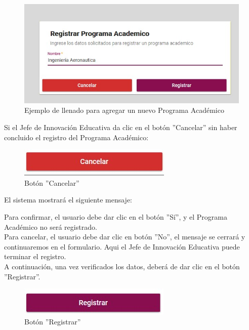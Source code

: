         \begin{figure}[!hbtp]
            \centering
            \hypertarget{ejreg}{\includegraphics[width=0.7\linewidth]{images/SP3/Llenado}}
            \caption{Ejemplo de llenado para agregar un nuevo Programa Académico}
            \label{ejreg}
        \end{figure}

        Si el Jefe de Innovación Educativa da clic en el botón ''Cancelar'' sin haber concluido el registro del Programa Académico:

        \begin{figure}[!hbtp]
            \centering
            \hypertarget{cancel1}{\includegraphics[width=0.7\linewidth]{images/SP3/BtnCancelar}}
            \caption{Botón ''Cancelar''}
            \label{cancel1}
        \end{figure}

        El sistema mostrará el siguiente mensaje:

        Para confirmar, el usuario debe dar clic en el botón ''Sí'', y el Programa Académico no será registrado.\\

        Para cancelar, el usuario debe dar clic en botón ''No'', el mensaje se cerrará y continuaremos en el formulario. Aqui el Jefe de Innovación Educativa puede terminar el registro.\\

        A continuación, una vez verificados los datos, deberá de dar clic en el botón ''Registrar''.
        \begin{figure}[!hbtp]
            \centering
            \hypertarget{btnreg}{\includegraphics[width=0.7\linewidth]{images/SP3/BtnRegistrar}}
            \caption{Botón ''Registrar''}
            \label{btnreg}
        \end{figure}

